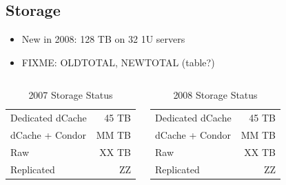 \documentclass{beamer}
\begin{document}
\subsection{Storage}
\begin{frame}
\begin{itemize}
    \item New in 2008: 128 TB on 32 1U servers
    \item FIXME: OLDTOTAL, NEWTOTAL (table?)
\end{itemize}

\begin{columns}
\column{2.5in}
\begin{table}
    \begin{tabular}{lr}
        \toprule
        Dedicated dCache & 45 TB \\
        dCache + Condor & MM TB \\
        \midrule
        Raw & XX TB \\
        Replicated & ZZ \\
        \bottomrule
    \end{tabular}
    \caption{2007 Storage Status}
    \label{2007_storage_status}
\end{table}

\column{2.5in}
\begin{table}
    \begin{tabular}{lr}
        \toprule
        Dedicated dCache & 45 TB \\
        dCache + Condor & MM TB \\
        \midrule
        Raw & XX TB \\
        Replicated & ZZ \\
        \bottomrule
    \end{tabular}
    \caption{2008 Storage Status}
    \label{2008_storage_status}
\end{table}

\end{columns}
\end{frame}
\end{document}
